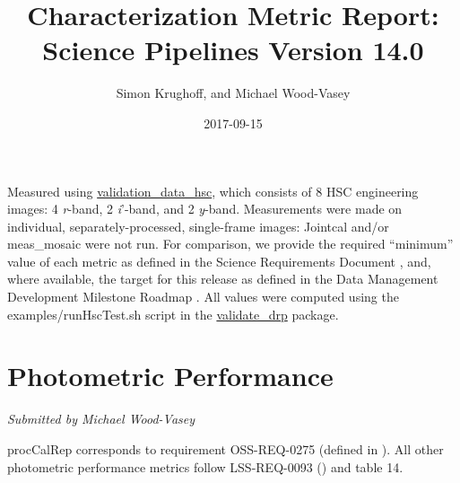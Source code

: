 \documentclass[DM,toc]{lsstdoc}
\title[V14.0 Characterization Report]{Characterization Metric Report: Science Pipelines Version 14.0}
\author{Simon Krughoff, and Michael Wood-Vasey}
\date{2017-09-15}
\begin{document}
\maketitle

Measured using
\href{https://github.com/lsst/validation_data_hsc}{validation\_data\_hsc},
which consists of 8 HSC engineering images: 4 \emph{r}-band, 2
\emph{i}'-band, and 2 \emph{y}-band. Measurements were made on
individual, separately-processed, single-frame images: Jointcal and/or
meas\_mosaic were not run. For comparison, we provide the \SRD required
``minimum'' value of each metric as defined in the Science Requirements
Document , and, where available, the
target for this release as defined in the Data Management Development
Milestone Roadmap . All values
were computed using the examples/runHscTest.sh script in the
\href{https://github.com/lsst/validate_drp}{validate\_drp} package.

\section{Photometric Performance}\label{photometric-performance}

\emph{Submitted by Michael Wood-Vasey}

procCalRep corresponds to requirement OSS-REQ-0275 (defined in
). All other photometric performance
metrics follow LSS-REQ-0093 () and
 table 14.
\end{document}
